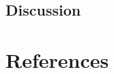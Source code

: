 \documentclass[11pt, a4paper]{article}
\begin{document}
\hypertarget{discussion}{%
\subsection{Discussion}\label{discussion}}

\clearpage

\hypertarget{references}{%
\section{References}\label{references}}

\setlength{\parindent}{-0.2in}
\setlength{\parskip}{8pt}

\noindent


\end{document}
